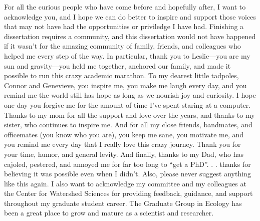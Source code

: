 \documentclass[twoside,12pt,final]{ucthesis-CA2012}
\begin{document}
\begin{ucfrontmatter}
\begin{dedication}
\begin{center}
\begin{Large}
      \end{Large}
      \end{center}
  \end{dedication}
  \begin{acknowledgements}
    For all the curious people who have come before and hopefully after, I
    want to acknowledge you, and I hope we can do better to inspire and
    support those voices that may not have had the opportunities or
    priviledge I have had. Finishing a dissertation requires a community,
    and this dissertation would not have happened if it wasn't for the
    amazing community of family, friends, and colleagues who helped me every
    step of the way. In particular, thank you to Leslie---you are my sun and
    gravity---you held me together, anchored our family, and made it
    possible to run this crazy academic marathon. To my dearest little
    tadpoles, Connor and Genevieve, you inspire me, you make me laugh every
    day, and you remind me the world still has hope as long as we nourish
    joy and curiosity. I hope one day you forgive me for the amount of time
    I've spent staring at a computer. Thanks to my mom for all the support
    and love over the years, and thanks to my sister, who continues to
    inspire me. And for all my close friends, bandmates, and officemates
    (you know who you are), you keep me sane, you motivate me, and you
    remind me every day that I really love this crazy journey. Thank you for
    your time, humor, and general levity. And finally, thanks to my Dad, who
    has cajoled, pestered, and annoyed me for far too long to ``get a PhD''.
    . . thanks for believing it was possible even when I didn't. Also,
    please never suggest anything like this again. I also want to
    acknowledge my committee and my colleagues at the Center for Watershed
    Sciences for providing feedback, guidance, and support throughout my
    graduate student career. The Graduate Group in Ecology has been a great
    place to grow and mature as a scientist and researcher.
  \end{acknowledgements}
  \begin{abstract}


\end{abstract}
\end{ucfrontmatter}
\end{document}
